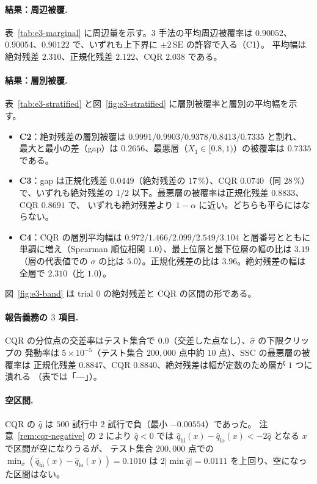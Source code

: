 \documentclass[a4paper,11pt]{jsarticle}
\theoremstyle{definition}
\theoremstyle{plain}
\theoremstyle{remark}
\newcommand{\qhat}{\hat{q}}
\begin{document}
\paragraph{結果：周辺被覆.}
表~\ref{tab:e3-marginal} に周辺量を示す。$3$ 手法の平均周辺被覆率は $0.90052$、
$0.90054$、$0.90122$ で、いずれも上下界に $\pm2\,\mathrm{SE}$ の許容で入る（C1）。
平均幅は絶対残差 $2.310$、正規化残差 $2.122$、CQR $2.038$ である。

\paragraph{結果：層別被覆.}
表~\ref{tab:e3-stratified} と図~\ref{fig:e3-stratified} に層別被覆率と層別の平均幅を示す。
\begin{itemize}
  \item \textbf{C2}：絶対残差の層別被覆は $0.9991/0.9903/0.9378/0.8413/0.7335$ と割れ、
    最大と最小の差（gap）は $0.2656$、最悪層（$X_1\in[0.8,1)$）の被覆率は $0.7335$ である。
  \item \textbf{C3}：gap は正規化残差 $0.0449$（絶対残差の $17\,\%$）、CQR $0.0740$（同 $28\,\%$）
    で、いずれも絶対残差の $1/2$ 以下。最悪層の被覆率は正規化残差 $0.8833$、CQR $0.8691$ で、
    いずれも絶対残差より $1-\alpha$ に近い。どちらも平らにはならない。
  \item \textbf{C4}：CQR の層別平均幅は $0.972/1.466/2.099/2.549/3.104$ と層番号とともに
    単調に増え（Spearman 順位相関 $1.0$）、最上位層と最下位層の幅の比は $3.19$
    （層の代表値での $\sigma$ の比は $5.0$）。正規化残差の比は $3.96$。絶対残差の幅は
    全層で $2.310$（比 $1.0$）。
\end{itemize}
図~\ref{fig:e3-band} は trial $0$ の絶対残差と CQR の区間の形である。

\paragraph{報告義務の $3$ 項目.}
CQR の分位点の交差率はテスト集合で $0.0$（交差した点なし）、$\hat\sigma$ の下限クリップの
発動率は $5\times10^{-5}$（テスト集合 $200{,}000$ 点中約 $10$ 点）、SSC の最悪層の被覆率は
正規化残差 $0.8847$、CQR $0.8840$、絶対残差は幅が定数のため層が $1$ つに潰れる
（表では「---」）。

\paragraph{空区間.}
CQR の $\qhat$ は $500$ 試行中 $2$ 試行で負（最小 $-0.00554$）であった。
注意~\ref{rem:cqr-negative} の 2 により $\qhat<0$ では
$\qhat_{\mathrm{hi}}(x)-\qhat_{\mathrm{lo}}(x)<-2\qhat$ となる $x$ で区間が空になりうるが、
テスト集合 $200{,}000$ 点での $\min_x(\qhat_{\mathrm{hi}}(x)-\qhat_{\mathrm{lo}}(x))=0.1010$
は $2|\min\qhat|=0.0111$ を上回り、空になった区間はない。
\end{document}
